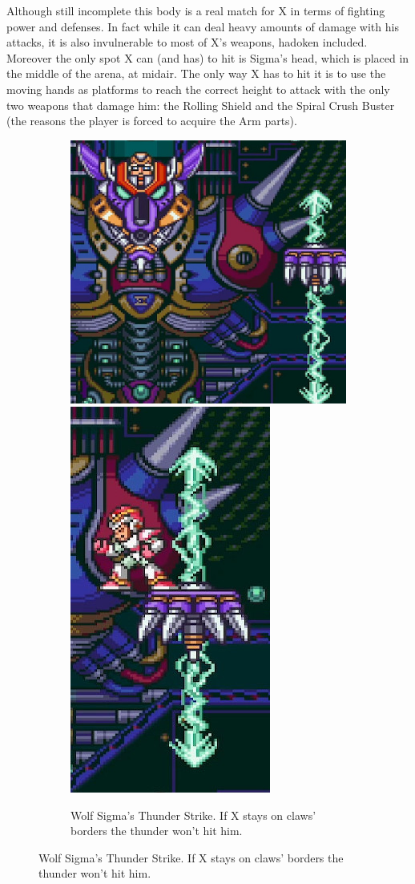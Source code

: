 Although still incomplete this body is a real match for X in terms of fighting power and defenses. In fact while it can deal heavy amounts of damage with his attacks, it is also invulnerable to most of X's weapons, hadoken included. Moreover the only spot X can (and has) to hit is Sigma's head, which is placed in the middle of the arena, at midair. The only way X has to hit it is to use the moving hands as platforms to reach the correct height to attack with the only two weapons that damage him: the Rolling Shield and the Spiral Crush Buster (the reasons the player is forced to acquire the Arm parts).
\begin{figure}[htp]
	\centering
	\begin{subfigure}{0.85\linewidth}
		\centering
		\includegraphics[width=0.65\linewidth]{figures/X1/Sigma_stages/WolfSigma_thunder.jpg}
		\includegraphics[width=0.32\linewidth]{figures/X1/Sigma_stages/WolfSigma_thunder_2.jpg}
		\caption{Wolf Sigma's Thunder Strike. If X stays on claws' borders the thunder won't hit him.}

\end{subfigure}
\end{figure}
